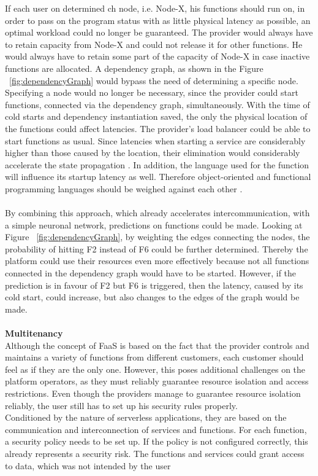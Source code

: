 \documentclass[a4paper,twoside,11pt, pagesize]{scrartcl}
\begin{document}
\begin{spacing}{1.2}
If each user  on determined ch node, i.e. Node-X, his functions should run on, in order to pass on the program status with as little physical latency as possible, an optimal workload could no longer be guaranteed. The provider would always have to retain capacity from Node-X and could not release it for other functions. He would always have to retain some part of the capacity of Node-X in case inactive functions are allocated. A dependency graph, as shown in the Figure ~\ref{fig:dependencyGraph} would bypass the need of determining a specific node. Specifying a node would no longer be necessary, since the provider could start functions, connected via the dependency graph, simultaneously. With the time of cold starts and dependency instantiation saved, the only the physical location of the functions could affect latencies. The provider's load balancer could be able to start functions as usual. Since latencies when starting a service are considerably higher than those caused by the location, their elimination would considerably accelerate the state propagation \cite{aditya2019will} \cite{jackson2018investigation}. In addition, the language used for the function will influence its startup latency as well. Therefore object-oriented and functional programming languages should be weighed against each other \cite{manner2018cold}.\\\\ By combining this approach, which already accelerates intercommunication, with a simple neuronal network, predictions on functions could be made. Looking at Figure ~\ref{fig:dependencyGraph}, by weighting the edges connecting the nodes, the probability of hitting F2 instead of F6 could be further determined. Thereby the platform could use their resources even more effectively because not all functions connected in the dependency graph would have to be started. However, if the prediction is in favour of F2 but F6 is triggered, then the latency, caused by its cold start, could increase, but also changes to the edges of the graph would be made.\\\\ \textbf{Multitenancy}\\ Although the concept of FaaS is based on the fact that the provider controls and maintains a variety of functions from different customers, each customer should feel as if they are the only one. However, this poses additional challenges on the platform operators, as they must reliably guarantee resource isolation and access restrictions. Even though the providers manage to guarantee resource isolation reliably, the user still has to set up his security rules properly.\\ Conditioned by the nature of serverless applications, they are based on the communication and interconnection of services and functions. For each function, a security policy needs to be set up. If the policy is not configured correctly, this already represents a security risk. The functions and services could grant access to data, which was not intended by the user 
\end{spacing}
\end{document}
